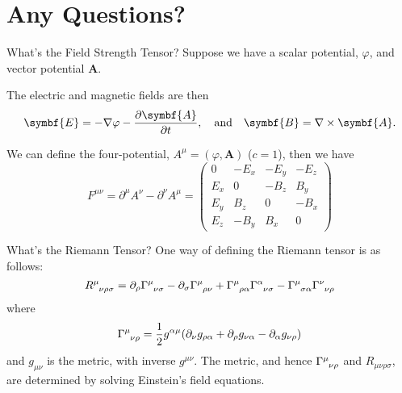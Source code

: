 \documentclass{beamer}
\newcommand{\vv}[1]{\symbf{#1}}
\newcommand{\grad}{\nabla}
\newcommand{\curl}{\nabla\times}
\begin{document}
    \section{Any Questions?}
    
    \begin{frame}{What's the Field Strength Tensor?}
        Suppose we have a scalar potential, \(\varphi\), and vector potential \(\vv{A}\).
        
        The electric and magnetic fields are then
        \begin{equation*}
            \vv{E} = -\grad \varphi - \diffp{\vv{A}}{t}, \quad\text{and}\quad \vv{B} = \curl \vv{A}.
        \end{equation*}
        
        We can define the four-potential, \(A^\mu = (\varphi, \vv{A})\) (\(c = 1\)), then we have
        \begin{equation*}
            F^{\mu\nu} = \partial^\mu A^\nu - \partial^\nu A^\mu =
            \begin{pmatrix}
                0 & -E_x & -E_y & -E_z\\
                E_x & 0 & -B_z & B_y\\
                E_y & B_z & 0 & -B_x\\
                E_z & -B_y & B_x & 0
            \end{pmatrix}
            \tag{\(c = 1\)}
        \end{equation*}
    \end{frame}
    
    \begin{frame}{What's the Riemann Tensor?}
        One way of defining the Riemann tensor is as follows:
        \begin{equation*}
            \tensor{R}{^\mu_{\nu\rho\sigma}} = \partial_\rho \tensor{\Gamma}{^\mu_{\nu\sigma}} - \partial_\sigma \tensor{\Gamma}{^\mu_{\rho\nu}} + \tensor{\Gamma}{^\mu_{\rho\alpha}}\tensor{\Gamma}{^\alpha_{\nu\sigma}} - \tensor{\Gamma}{^\mu_{\sigma\alpha}}\tensor{\Gamma}{^\nu_{\nu\rho}}
        \end{equation*}
        where
        \begin{equation*}
            \tensor{\Gamma}{^\mu_{\nu\rho}} = \frac{1}{2}g^{\alpha\mu}(\partial_\nu g_{\rho\alpha} + \partial_\rho g_{\nu\alpha} - \partial_\alpha g_{\nu\rho})
        \end{equation*}
        and \(g_{\mu\nu}\) is the metric, with inverse \(g^{\mu\nu}\).
        The metric, and hence \(\tensor{\Gamma}{^\mu_{\nu\rho}}\) and \(R_{\mu\nu\rho\sigma}\), are determined by solving Einstein's field equations.
    \end{frame}
    
\end{document}
